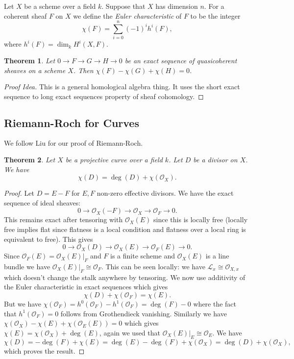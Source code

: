 \documentclass[12pt]{article}
\numberwithin{equation}{section}
\newtheorem{theorem}{Theorem}[subsection]
\theoremstyle{definition}
\theoremstyle{remark}
\newcommand{\Ocal}{\mathcal{O}}
\newcommand{\Lcal}{\mathcal{L}}
\begin{document}
Let $X$ be a scheme over a field $k$. 
Suppose that $X$ has dimension $n$. 
For a coherent sheaf $F$ on $X$ we define the \emph{Euler characteristic} of $F$ to be the integer
$$ \chi(F) = \sum_{i=0}^n (-1)^i h^i(F), $$
where $h^i(F) = \dim_k H^i(X,F)$.
\begin{theorem}
	Let $0\to F \to G \to H \to 0$ be an exact sequence of quasicoherent sheaves on a scheme $X$. 
	Then $\chi(F) - \chi(G) + \chi(H)=0$.
\end{theorem}
\begin{proof}[Proof Idea]
	This is a general homological algebra thing. 
	It uses the short exact sequence to long exact sequences property of sheaf cohomology. 
\end{proof}

\subsection{Riemann-Roch for Curves}
We follow Liu for our proof of Riemann-Roch. 

\begin{theorem}
	Let $X$ be a projective curve over a field $k$. 
	Let $D$ be a divisor on $X$. 
	We have 
	$$\chi(D) = \deg(D) + \chi(\Ocal_X).$$
\end{theorem}
\begin{proof}
	Let $D=E-F$ for $E,F$ non-zero effective divisors. 
	We have the exact sequence of ideal sheaves:
	$$ 0 \to \Ocal_X(-F) \to \Ocal_X \to \Ocal_F \to 0. $$
	This remains exact after tensoring with $\Ocal_X(E)$ since this is locally free (locally free implies flat since flatness is a local condition and flatness over a local ring is equivalent to free). 
	This gives 
	$$ 0 \to \Ocal_X(D) \to \Ocal_X(E) \to \Ocal_F(E) \to 0. $$
	Since $\Ocal_F(E) = \Ocal_X(E)\vert_F$ and $F$ is a finite scheme and $\Ocal_X(E)$ is a line bundle we have $\Ocal_X(E)\vert_F \cong \Ocal_F$.
	This can be seen locally: we have $\Lcal_x \cong \Ocal_{X,x}$ which doesn't change the stalk anywhere by tensoring. 
	We now use additivity of the Euler characteristic in exact sequences which gives 
	$$ \chi(D) + \chi(\Ocal_F) = \chi(E).$$
	But we have $\chi(\Ocal_F) = h^0(\Ocal_F) - h^1(\Ocal_F)=\deg(F) -0$ where the fact that $h^1(\Ocal_F)=0$ follows from Grothendieck vanishing.
	Similarly we have $\chi(\Ocal_X)-\chi(E)+\chi(\Ocal_E(E))=0$ which gives $\chi(E) = \chi(\Ocal_X)+\deg(E)$, again we used that $\Ocal_X(E)\vert_E \cong \Ocal_E$.
	We have 
	$$\chi(D) = -\deg(F)+\chi(E) = \deg(E)-\deg(F) + \chi(\Ocal_X) = \deg(D) + \chi(\Ocal_X),$$
	which proves the result.
\end{proof}
\end{document}
